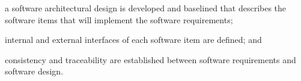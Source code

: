 			\begin{adjustwidth}{2em}{0pt} 

				\begin{compactitem}

					\item a software architectural design is developed and baselined that describes the software items that will implement the software requirements;

					\item internal and external interfaces of each software item are defined; and

					\item consistency and traceability are established between software requirements and software design.

				\end{compactitem}

			\end{adjustwidth}

